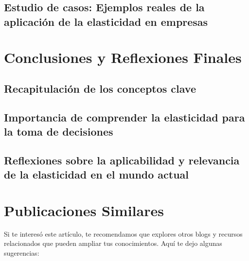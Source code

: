 \documentclass[
  jou,
  floatsintext,
  longtable,
  a4paper,
  nolmodern,
  notxfonts,
  notimes,
  colorlinks=true,linkcolor=blue,citecolor=blue,urlcolor=blue]{apa7}
\begin{document}
\subsection{Estudio de casos: Ejemplos reales de la aplicación de la
elasticidad en
empresas}\label{estudio-de-casos-ejemplos-reales-de-la-aplicaciuxf3n-de-la-elasticidad-en-empresas}

\section{Conclusiones y Reflexiones
Finales}\label{conclusiones-y-reflexiones-finales}

\subsection{Recapitulación de los conceptos
clave}\label{recapitulaciuxf3n-de-los-conceptos-clave}

\subsection{Importancia de comprender la elasticidad para la toma de
decisiones}\label{importancia-de-comprender-la-elasticidad-para-la-toma-de-decisiones}

\subsection{Reflexiones sobre la aplicabilidad y relevancia de la
elasticidad en el mundo
actual}\label{reflexiones-sobre-la-aplicabilidad-y-relevancia-de-la-elasticidad-en-el-mundo-actual}

\section{Publicaciones Similares}\label{publicaciones-similares}

Si te interesó este artículo, te recomendamos que explores otros blogs y
recursos relacionados que pueden ampliar tus conocimientos. Aquí te dejo
algunas sugerencias:
\end{document}
